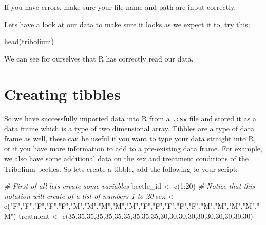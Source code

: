 \documentclass[
]{book}
\newenvironment{Shaded}{\begin{snugshade}}{\end{snugshade}}
\newcommand{\CommentTok}[1]{\textcolor[rgb]{0.56,0.35,0.01}{\textit{#1}}}
\newcommand{\DecValTok}[1]{\textcolor[rgb]{0.00,0.00,0.81}{#1}}
\newcommand{\FunctionTok}[1]{\textcolor[rgb]{0.00,0.00,0.00}{#1}}
\newcommand{\NormalTok}[1]{#1}
\newcommand{\OtherTok}[1]{\textcolor[rgb]{0.56,0.35,0.01}{#1}}
\newcommand{\SpecialCharTok}[1]{\textcolor[rgb]{0.00,0.00,0.00}{#1}}
\newcommand{\StringTok}[1]{\textcolor[rgb]{0.31,0.60,0.02}{#1}}
\begin{document}
If you have errors, make sure your file name and path are input correctly.

Lets have a look at our data to make sure it looks as we expect it to, try this;

\begin{Shaded}
\begin{Highlighting}[]
\FunctionTok{head}\NormalTok{(tribolium)}
\end{Highlighting}
\end{Shaded}

We can see for ourselves that R has correctly read our data.

\hypertarget{creating-tibbles}{%
\section{Creating tibbles}\label{creating-tibbles}}

So we have successfully imported data into R from a \texttt{.csv} file and stored it as a data frame which is a type of two dimensional array. Tibbles are a type of data frame as well, these can be useful if you want to type your data straight into R, or if you have more information to add to a pre-existing data frame. For example, we also have some additional data on the sex and treatment conditions of the Tribolium beetles. So lets create a tibble, add the following to your script;

\begin{Shaded}
\begin{Highlighting}[]
\CommentTok{\# First of all lets create some variables}
\NormalTok{beetle\_id }\OtherTok{\textless{}{-}} \FunctionTok{c}\NormalTok{(}\DecValTok{1}\SpecialCharTok{:}\DecValTok{20}\NormalTok{) }\CommentTok{\# Notice that this notation will create of a list of numbers 1 to 20}
\NormalTok{sex }\OtherTok{\textless{}{-}} \FunctionTok{c}\NormalTok{(}\StringTok{"F"}\NormalTok{,}\StringTok{"F"}\NormalTok{,}\StringTok{"F"}\NormalTok{,}\StringTok{"F"}\NormalTok{,}\StringTok{"F"}\NormalTok{,}\StringTok{"M"}\NormalTok{,}\StringTok{"M"}\NormalTok{,}\StringTok{"M"}\NormalTok{,}\StringTok{"M"}\NormalTok{,}\StringTok{"M"}\NormalTok{,}\StringTok{"F"}\NormalTok{,}\StringTok{"F"}\NormalTok{,}\StringTok{"F"}\NormalTok{,}\StringTok{"F"}\NormalTok{,}\StringTok{"F"}\NormalTok{,}\StringTok{"M"}\NormalTok{,}\StringTok{"M"}\NormalTok{,}\StringTok{"M"}\NormalTok{,}\StringTok{"M"}\NormalTok{,}\StringTok{"M"}\NormalTok{)}
\NormalTok{treatment }\OtherTok{\textless{}{-}} \FunctionTok{c}\NormalTok{(}\DecValTok{35}\NormalTok{,}\DecValTok{35}\NormalTok{,}\DecValTok{35}\NormalTok{,}\DecValTok{35}\NormalTok{,}\DecValTok{35}\NormalTok{,}\DecValTok{35}\NormalTok{,}\DecValTok{35}\NormalTok{,}\DecValTok{35}\NormalTok{,}\DecValTok{35}\NormalTok{,}\DecValTok{35}\NormalTok{,}\DecValTok{30}\NormalTok{,}\DecValTok{30}\NormalTok{,}\DecValTok{30}\NormalTok{,}\DecValTok{30}\NormalTok{,}\DecValTok{30}\NormalTok{,}\DecValTok{30}\NormalTok{,}\DecValTok{30}\NormalTok{,}\DecValTok{30}\NormalTok{,}\DecValTok{30}\NormalTok{,}\DecValTok{30}\NormalTok{)}
\end{Highlighting}
\end{Shaded}
\end{document}
